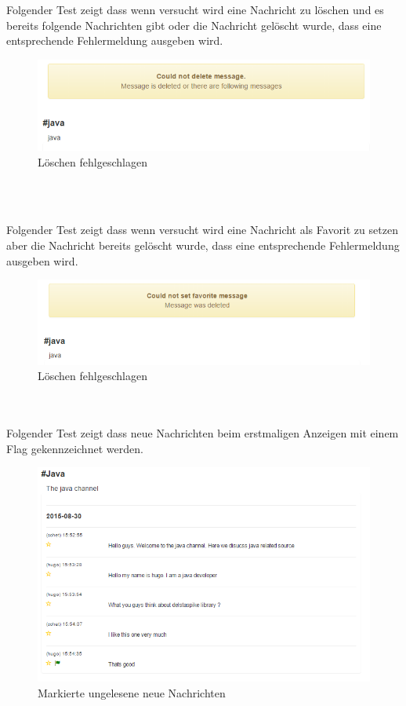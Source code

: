 \documentclass[11pt, a4paper, twoside]{article}   	%
\begin{document}
Folgender Test zeigt dass wenn versucht wird eine Nachricht zu löschen und es bereits folgende Nachrichten gibt oder die Nachricht gelöscht wurde, dass eine entsprechende Fehlermeldung ausgeben wird.
\begin{figure}[h]
	\centering
	\includegraphics[scale=0.5]{images/start_channel_chat_delete_following_messages.PNG}
	\caption
	{Löschen fehlgeschlagen}
\end{figure}\\\\
\newpage

Folgender Test zeigt dass wenn versucht wird eine Nachricht als Favorit zu setzen aber die Nachricht bereits gelöscht wurde, dass eine entsprechende Fehlermeldung ausgeben wird.
\begin{figure}[h]
	\centering
	\includegraphics[scale=0.5]{images/start_channel_chat_set_favorite_fail.PNG}
	\caption
	{Löschen fehlgeschlagen}
\end{figure}\\\\

Folgender Test zeigt dass neue Nachrichten beim erstmaligen Anzeigen mit einem Flag gekennzeichnet werden.
\begin{figure}[h]
	\centering
	\includegraphics[scale=0.5]{images/start_channel_chat_marked_unread.PNG}
	\caption
	{Markierte ungelesene neue Nachrichten}
\end{figure}\\\\
\newpage
\end{document}
